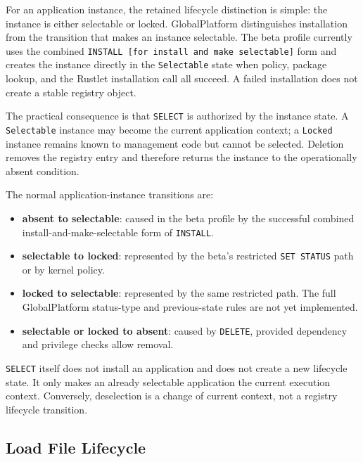 
For an application instance, the retained lifecycle distinction is simple:
the instance is either selectable or locked. GlobalPlatform distinguishes
installation from the transition that makes an instance selectable. The beta
profile currently uses the combined \texttt{INSTALL [for install and make
selectable]} form and creates the instance directly in the
\texttt{Selectable} state when policy, package lookup, and the Rustlet
installation call all succeed. A failed installation does not create a stable
registry object.

The practical consequence is that \texttt{SELECT} is authorized by the
instance state. A \texttt{Selectable} instance may become the current
application context; a \texttt{Locked} instance remains known to management
code but cannot be selected. Deletion removes the registry entry and therefore
returns the instance to the operationally absent condition.

The normal application-instance transitions are:

\begin{itemize}
\item \textbf{absent to selectable}: caused in the beta profile by the
  successful combined install-and-make-selectable form of \texttt{INSTALL}.
\item \textbf{selectable to locked}: represented by the beta's restricted
  \texttt{SET STATUS} path or by kernel policy.
\item \textbf{locked to selectable}: represented by the same restricted
  path. The full GlobalPlatform status-type and previous-state rules are not
  yet implemented.
\item \textbf{selectable or locked to absent}: caused by \texttt{DELETE},
  provided dependency and privilege checks allow removal.
\end{itemize}

\texttt{SELECT} itself does not install an application and does not create a
new lifecycle state. It only makes an already selectable application the
current execution context. Conversely, deselection is a change of current
context, not a registry lifecycle transition.

\subsection{Load File Lifecycle}
\label{sec:gp-lifecycle-loadfile}

